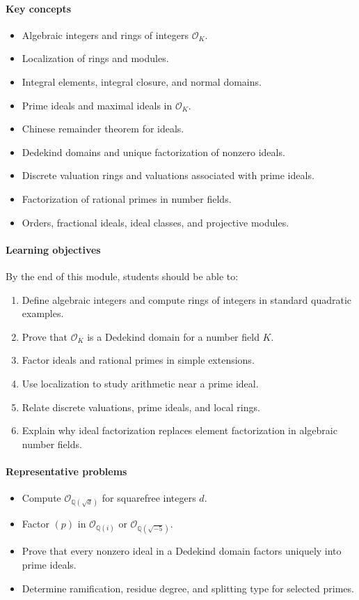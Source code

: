 \documentclass[11pt]{article}
\newcommand{\Q}{\mathbb{Q}}
\begin{document}
\paragraph{Key concepts}
\begin{itemize}
    \item Algebraic integers and rings of integers $\mathcal{O}_K$.
    \item Localization of rings and modules.
    \item Integral elements, integral closure, and normal domains.
    \item Prime ideals and maximal ideals in $\mathcal{O}_K$.
    \item Chinese remainder theorem for ideals.
    \item Dedekind domains and unique factorization of nonzero ideals.
    \item Discrete valuation rings and valuations associated with prime ideals.
    \item Factorization of rational primes in number fields.
    \item Orders, fractional ideals, ideal classes, and projective modules.
\end{itemize}

\paragraph{Learning objectives}
By the end of this module, students should be able to:
\begin{enumerate}
    \item Define algebraic integers and compute rings of integers in standard quadratic examples.
    \item Prove that $\mathcal{O}_K$ is a Dedekind domain for a number field $K$.
    \item Factor ideals and rational primes in simple extensions.
    \item Use localization to study arithmetic near a prime ideal.
    \item Relate discrete valuations, prime ideals, and local rings.
    \item Explain why ideal factorization replaces element factorization in algebraic number fields.
\end{enumerate}

\paragraph{Representative problems}
\begin{itemize}
    \item Compute $\mathcal{O}_{\Q(\sqrt{d})}$ for squarefree integers $d$.
    \item Factor $(p)$ in $\mathcal{O}_{\Q(i)}$ or $\mathcal{O}_{\Q(\sqrt{-5})}$.
    \item Prove that every nonzero ideal in a Dedekind domain factors uniquely into prime ideals.
    \item Determine ramification, residue degree, and splitting type for selected primes.
\end{itemize}
\end{document}

